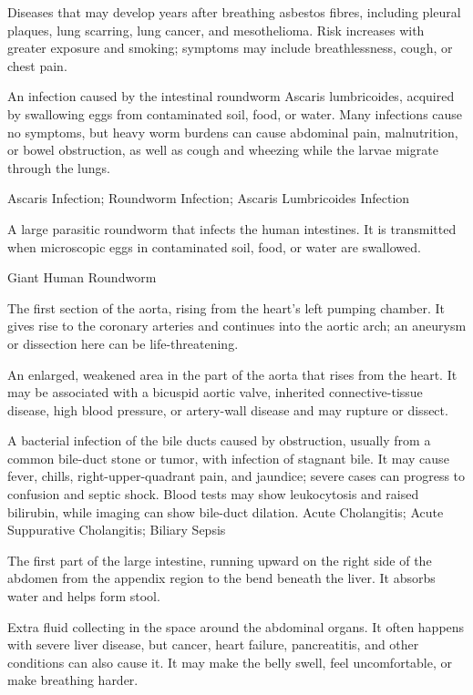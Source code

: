  Diseases that may develop years after breathing asbestos fibres, including pleural plaques, lung scarring, lung cancer, and mesothelioma. Risk increases with greater exposure and smoking; symptoms may include breathlessness, cough, or chest pain.

 An infection caused by the intestinal roundworm Ascaris lumbricoides, acquired by swallowing eggs from contaminated soil, food, or water. Many infections cause no symptoms, but heavy worm burdens can cause abdominal pain, malnutrition, or bowel obstruction, as well as cough and wheezing while the larvae migrate through the lungs.

\synonyms
Ascaris Infection; Roundworm Infection; Ascaris Lumbricoides Infection

 A large parasitic roundworm that infects the human intestines. It is transmitted when microscopic eggs in contaminated soil, food, or water are swallowed.

\synonyms
Giant Human Roundworm

 The first section of the aorta, rising from the heart’s left pumping chamber. It gives rise to the coronary arteries and continues into the aortic arch; an aneurysm or dissection here can be life-threatening.

 An enlarged, weakened area in the part of the aorta that rises from the heart. It may be associated with a bicuspid aortic valve, inherited connective-tissue disease, high blood pressure, or artery-wall disease and may rupture or dissect.

 A bacterial infection of the bile ducts caused by obstruction, usually from a common bile-duct stone or tumor, with infection of stagnant bile. It may cause fever, chills, right-upper-quadrant pain, and jaundice; severe cases can progress to confusion and septic shock. Blood tests may show leukocytosis and raised bilirubin, while imaging can show bile-duct dilation.
\synonyms
Acute Cholangitis; Acute Suppurative Cholangitis; Biliary Sepsis

 The first part of the large intestine, running upward on the right side of the abdomen from the appendix region to the bend beneath the liver. It absorbs water and helps form stool.

 Extra fluid collecting in the space around the abdominal organs. It often happens with severe liver disease, but cancer, heart failure, pancreatitis, and other conditions can also cause it. It may make the belly swell, feel uncomfortable, or make breathing harder.

